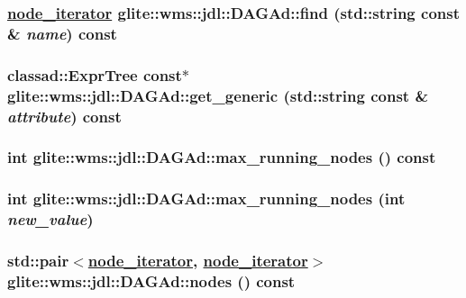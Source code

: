 \hypertarget{classglite_1_1wms_1_1jdl_1_1DAGAd_a13}{
\subsubsection[find]{\setlength{\rightskip}{0pt plus 5cm}\hyperlink{classglite_1_1wms_1_1jdl_1_1DAGAdNodeIterator}{node\_\-iterator} glite::wms::jdl::DAGAd::find (std::string const \& {\em name}) const}}
\label{classglite_1_1wms_1_1jdl_1_1DAGAd_a13}


\hypertarget{classglite_1_1wms_1_1jdl_1_1DAGAd_a18}{
\subsubsection[get\_\-generic]{\setlength{\rightskip}{0pt plus 5cm}classad::Expr\-Tree const$\ast$ glite::wms::jdl::DAGAd::get\_\-generic (std::string const \& {\em attribute}) const}}
\label{classglite_1_1wms_1_1jdl_1_1DAGAd_a18}


\hypertarget{classglite_1_1wms_1_1jdl_1_1DAGAd_a4}{
\subsubsection[max\_\-running\_\-nodes]{\setlength{\rightskip}{0pt plus 5cm}int glite::wms::jdl::DAGAd::max\_\-running\_\-nodes () const}}
\label{classglite_1_1wms_1_1jdl_1_1DAGAd_a4}


\hypertarget{classglite_1_1wms_1_1jdl_1_1DAGAd_a3}{
\subsubsection[max\_\-running\_\-nodes]{\setlength{\rightskip}{0pt plus 5cm}int glite::wms::jdl::DAGAd::max\_\-running\_\-nodes (int {\em new\_\-value})}}
\label{classglite_1_1wms_1_1jdl_1_1DAGAd_a3}


\hypertarget{classglite_1_1wms_1_1jdl_1_1DAGAd_a21}{
\subsubsection[nodes]{\setlength{\rightskip}{0pt plus 5cm}std::pair$<$\hyperlink{classglite_1_1wms_1_1jdl_1_1DAGAdNodeIterator}{node\_\-iterator}, \hyperlink{classglite_1_1wms_1_1jdl_1_1DAGAdNodeIterator}{node\_\-iterator}$>$ glite::wms::jdl::DAGAd::nodes () const}}
\label{classglite_1_1wms_1_1jdl_1_1DAGAd_a21}


